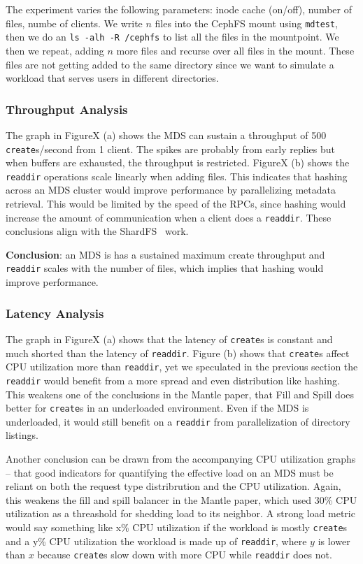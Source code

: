 \documentclass[conference]{acm_proc_article-sp} \usepackage[english]{babel}
\begin{document}
The experiment varies the following parameters: inode cache (on/off), number of
files, numbe of clients. We write \(n\) files into the CephFS mount using
\texttt{mdtest}, then we do an \texttt{ls -alh -R /cephfs} to list all the
files in the mountpoint. We then we repeat, adding \(n\) more files and recurse
over all files in the mount. These files are not getting added to the same
directory since we want to simulate a workload that serves users in different
directories.

\subsubsection{Throughput Analysis}

The graph in FigureX (a) shows the MDS can sustain a throughput of 500
\texttt{create}s/second from 1 client. The spikes are probably from early
replies but when buffers are exhausted, the throughput is restricted. FigureX
(b) shows the \texttt{readdir} operations scale linearly when adding files.
This indicates that hashing across an MDS cluster would improve performance by
parallelizing metadata retrieval. This would be limited by the speed of the
RPCs, since hashing would increase the amount of communication when a client
does a \texttt{readdir}. These conclusions align with the ShardFS~\cite{xiao:socc2015-shardfs} work.

\noindent\textbf{Conclusion}: an MDS is has a sustained maximum create
throughput and \texttt{readdir} scales with the number of files, which implies
that hashing would improve performance.

\subsubsection{Latency Analysis}

The graph in FigureX (a) shows that the latency of \texttt{create}s is constant
and much shorted than the latency of \texttt{readdir}. Figure (b) shows that
\texttt{create}s affect CPU utilization more than \texttt{readdir}, yet we
speculated in the previous section the \texttt{readdir} would benefit from a
more spread and even distribution like hashing.  This weakens one of the
conclusions in the Mantle paper, that Fill and Spill does better for
\texttt{create}s in an underloaded environment. Even if the MDS is underloaded,
it would still benefit on a \texttt{readdir} from parallelization of directory
listings.

Another conclusion can be drawn from the accompanying CPU utilization graphs --
that good indicators for quantifying the effective load on an MDS must be
reliant on both the request type distribrution and the CPU utilization. Again,
this weakens the fill and spill balancer in the Mantle paper, which used 30\%
CPU utilization as a threashold for shedding load to its neighbor. A strong
load metric would say something like x\% CPU utilization if the workload is
mostly \texttt{create}s and a y\% CPU utilization the workload is made up of
\texttt{readdir}, where \(y\) is lower than \(x\) because \texttt{create}s slow
down with more CPU while \texttt{readdir} does not.
\end{document}

